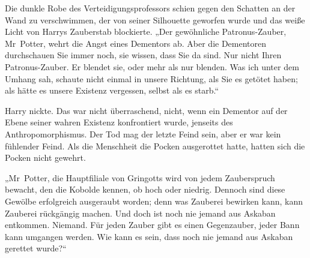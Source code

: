 Die dunkle Robe des Verteidigungsprofessors schien gegen den Schatten an der Wand zu verschwimmen, der von seiner Silhouette geworfen wurde und das weiße Licht von Harrys Zauberstab blockierte. „Der gewöhnliche Patronus-Zauber, Mr~Potter, wehrt die Angst eines Dementors ab. Aber die Dementoren durchschauen Sie immer noch, sie wissen, dass Sie da sind. Nur nicht Ihren Patronus-Zauber. Er blendet sie, oder mehr als nur blenden. Was ich unter dem Umhang sah, schaute nicht einmal in unsere Richtung, als Sie es getötet haben; als hätte es unsere Existenz vergessen, selbst als es starb.“

Harry nickte. Das war nicht überraschend, nicht, wenn ein Dementor auf der Ebene seiner wahren Existenz konfrontiert wurde, jenseits des Anthropomorphismus. Der Tod mag der letzte Feind sein, aber er war kein fühlender Feind. Als die Menschheit die Pocken ausgerottet hatte, hatten sich die Pocken nicht gewehrt.

„Mr~Potter, die Hauptfiliale von Gringotts wird von jedem Zauberspruch bewacht, den die Kobolde kennen, ob hoch oder niedrig. Dennoch sind diese Gewölbe erfolgreich ausgeraubt worden; denn was Zauberei bewirken kann, kann Zauberei rückgängig machen. Und doch ist noch nie jemand aus Askaban entkommen. Niemand. Für jeden Zauber gibt es einen Gegenzauber, jeder Bann kann umgangen werden. Wie kann es sein, dass noch nie jemand aus Askaban gerettet wurde?“

